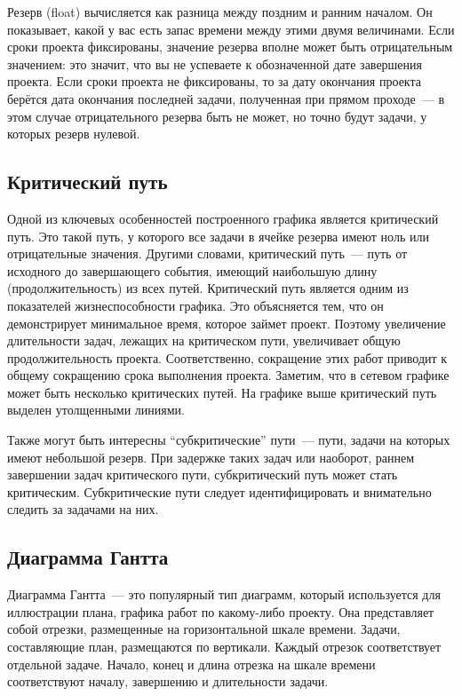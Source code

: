 \documentclass{../../text-style}
\begin{document}
Резерв (float) вычисляется как разница между поздним и ранним началом. Он показывает, какой у вас есть запас времени между этими двумя величинами. Если сроки проекта фиксированы, значение резерва вполне может быть отрицательным значением: это значит, что вы не успеваете к обозначенной дате завершения проекта. Если сроки проекта не фиксированы, то за дату окончания проекта берётся дата окончания последней задачи, полученная при прямом проходе~--- в этом случае отрицательного резерва быть не может, но точно будут задачи, у которых резерв нулевой.

\subsection{Критический путь}

Одной из ключевых особенностей построенного графика является критический путь. Это такой путь, у которого все задачи в ячейке резерва  имеют ноль или отрицательные значения. Другими словами, критический путь~--- путь от исходного до завершающего события, имеющий наибольшую длину (продолжительность) из всех путей. Критический путь является одним из показателей жизнеспособности графика. Это объясняется тем, что он демонстрирует минимальное время, которое займет проект. Поэтому увеличение длительности задач, лежащих на критическом пути, увеличивает общую продолжительность проекта. Соответственно, сокращение этих работ приводит к общему сокращению срока выполнения проекта. Заметим, что в сетевом графике может быть несколько критических путей. На графике выше критический путь выделен утолщенными линиями.

Также могут быть интересны \enquote{субкритические} пути~--- пути, задачи на которых имеют небольшой резерв. При задержке таких задач или наоборот, раннем завершении задач критического пути, субкритический путь может стать критическим. Субкритические пути следует идентифицировать и внимательно следить за задачами на них.

\subsection{Диаграмма Гантта}

Диаграмма Гантта~--- это популярный тип диаграмм, который используется для иллюстрации плана, графика работ по какому-либо проекту. Она представляет собой отрезки, размещенные на горизонтальной шкале времени. Задачи, составляющие план, размещаются по вертикали. Каждый отрезок соответствует отдельной задаче. Начало, конец и длина отрезка на шкале времени соответствуют началу, завершению и длительности задачи.
\end{document}
